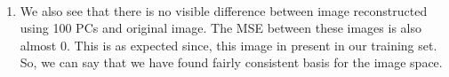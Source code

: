 \documentclass[11pt,letterpaper]{article}
\begin{document}
\begin{figure}
    \centering
     \\
    \end{figure}
\begin{enumerate}
    [label=$\bullet$]
    \item We also see that there is no visible difference between image reconstructed using 100 PCs and original image. The MSE between these images is also almost 0. This is as expected since, this image in present in our training set. So, we can say that we have found fairly consistent basis for the image space.
\end{enumerate}
\end{document}

